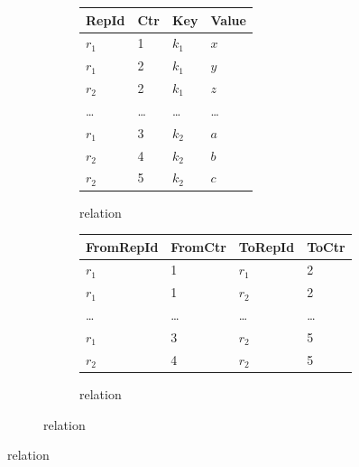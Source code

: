 \begin{figure}[htpb]
	\centering
	\small

	\begin{subfigure}[b]{\textwidth}
		\centering
		\begin{subfigure}[b]{0.45\textwidth}
			\centering
			\begin{tabular}{@{}llll@{}}
				\toprule
				RepId   & Ctr    & Key     & Value  \\
				\midrule
				\(r_1\) & 1      & \(k_1\) & \(x\)  \\
				\(r_1\) & 2      & \(k_1\) & \(y\)  \\
				\(r_2\) & 2      & \(k_1\) & \(z\)  \\
				\midrule
				\ldots  & \ldots & \ldots  & \ldots \\
				\midrule
				\(r_1\) & 3      & \(k_2\) & \(a\)  \\
				\(r_2\) & 4      & \(k_2\) & \(b\)  \\
				\(r_2\) & 5      & \(k_2\) & \(c\)  \\
				\bottomrule
			\end{tabular}
			\caption{ relation}\label{fig:mvr-store-set}
		\end{subfigure}
		\hspace{1em}
		\begin{subfigure}[b]{0.45\textwidth}
			\centering
			\begin{tabular}{@{}llll@{}}
				\toprule
				FromRepId & FromCtr & ToRepId & ToCtr  \\
				\midrule
				\(r_1\)   & 1       & \(r_1\) & 2      \\
				\(r_1\)   & 1       & \(r_2\) & 2      \\
				\midrule
				\ldots    & \ldots  & \ldots  & \ldots \\
				\midrule
				\(r_1\)   & 3       & \(r_2\) & 5      \\
				\(r_2\)   & 4       & \(r_2\) & 5      \\
				\bottomrule
			\end{tabular}
			\caption{ relation}\label{fig:mvr-store-pred}
		\end{subfigure}
	\end{subfigure}

	\vspace{1em}


\end{figure}

